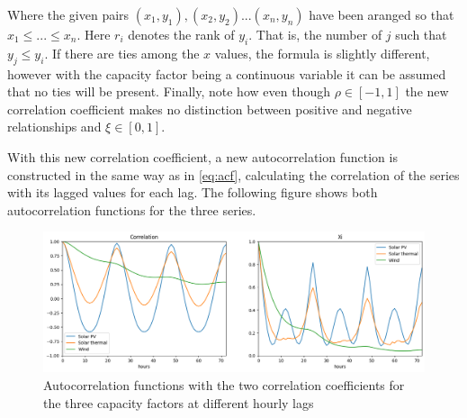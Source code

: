 Where the given pairs $\left(x_1,y_1\right), \left(x_2,y_2\right)...\left(x_n,y_n\right)$ have been aranged so that $x_1 \leq...\leq x_n$. Here $r_i$ denotes the rank of $y_i$. That is, the number of $j$ such that $y_j\leq y_i$. If there are ties among the $x$ values, the formula is slightly different, however with the capacity factor being a continuous variable it can be assumed that no ties will be present. Finally, note how even though $\rho \in \left[-1,1\right]$ the new correlation coefficient makes no distinction between positive and negative relationships and $\xi \in \left[0,1\right]$.

With this new correlation coefficient, a new autocorrelation function is constructed in the same way as in \eqref{eq:acf}, calculating the correlation of the series with its lagged values for each lag. The following figure shows both autocorrelation functions for the three series. 

\begin{figure}[ht]
    \centering
    \captionsetup{justification=centering}
    \includegraphics[width=\linewidth]{assets/autocorrelation.png}
    \caption{Autocorrelation functions with the two correlation coefficients for the three capacity factors at different hourly lags}
    \label{fig:autocorrelation}
\end{figure}

